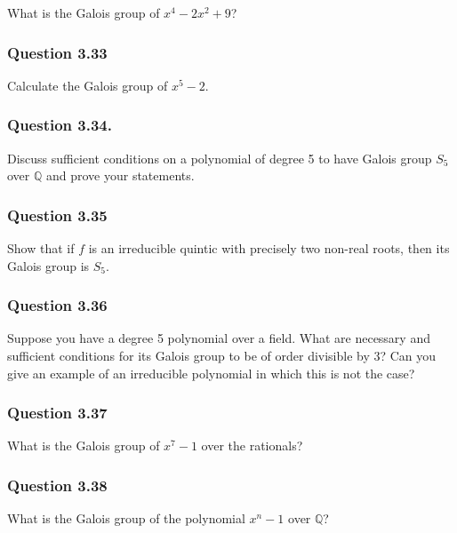 What is the Galois group of \(x^4 - 2x^2 + 9\)?

\hypertarget{question-3.33}{%
\subsubsection{Question 3.33}\label{question-3.33}}

Calculate the Galois group of \(x^5 - 2\).

\hypertarget{question-3.34.}{%
\subsubsection{Question 3.34.}\label{question-3.34.}}

Discuss sufficient conditions on a polynomial of degree 5 to have Galois
group \(S_5\) over \({\mathbb{Q}}\) and prove your statements.

\hypertarget{question-3.35}{%
\subsubsection{Question 3.35}\label{question-3.35}}

Show that if \(f\) is an irreducible quintic with precisely two non-real
roots, then its Galois group is \(S_5\).

\hypertarget{question-3.36}{%
\subsubsection{Question 3.36}\label{question-3.36}}

Suppose you have a degree 5 polynomial over a field. What are necessary
and suﬃcient conditions for its Galois group to be of order divisible by
3? Can you give an example of an irreducible polynomial in which this is
not the case?

\hypertarget{question-3.37}{%
\subsubsection{Question 3.37}\label{question-3.37}}

What is the Galois group of \(x^7 - 1\) over the rationals?

\hypertarget{question-3.38}{%
\subsubsection{Question 3.38}\label{question-3.38}}

What is the Galois group of the polynomial \(x^n - 1\) over
\({\mathbb{Q}}\)?

